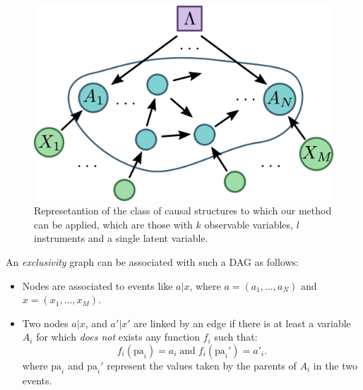 \documentclass[letterpaper]{article}
\newcommand{\et}{\;\mathrm{and}\;}
\newcommand{\pa}{\mathrm{pa}}
\begin{document}
\begin{figure}[h]
    \centering
    \includegraphics[width=.9\columnwidth]{images/onelambda.pdf}
    \caption{Represetantion of the class of causal structures to which our
        method can be applied, which are those with $k$ observable variables, $l$
        instruments and a single latent variable.}
    \label{fig:onelambda}
\end{figure}

An \emph{exclusivity} graph can be associated with such a DAG
as follows:
\begin{itemize}
    \item Nodes are associated to events like $a | x$, where $a = (a_1,\ldots,a_N)$ and  $x = (x_1,\ldots,x_M)$.
    \item Two nodes $a | x $, and $a' | x'$ are linked by an edge if
    there is at least a variable $A_i$ for which \emph{does not} exists
    any function $f_i$ such that: 
    \begin{equation}
        f_i(\pa_i) = a_i \et f_i(\pa_i') = a'_i.
    \end{equation}
    where $\pa_i$ and $\pa_i'$ represent the values taken by the parents
    of $A_i$ in the two events.
\end{itemize}
\end{document}
